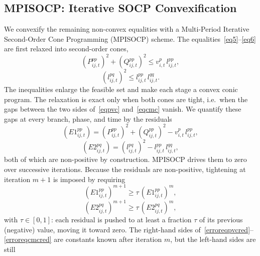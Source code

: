 \subsection{MPISOCP: Iterative SOCP Convexification}
\label{ssec:mpisocp}

We convexify the remaining non-convex equalities with a Multi-Period
Iterative Second-Order Cone Programming (MPISOCP) scheme. The
equalities~\eqref{eq5}--\eqref{eq6} are first relaxed into second-order
cones,
\begin{equation}\label{eqpvc}
\left( P_{ij,t}^{pp} \right)^2 + \left( Q_{ij,t}^{pp} \right)^2
\leq v_{i,t}^p \, l_{ij,t}^{pp},
\end{equation}
\begin{equation}\label{eqcmc}
\left( l_{ij,t}^{pq} \right)^2 \leq l_{ij,t}^{pp} \, l_{ij,t}^{qq}.
\end{equation}
The inequalities enlarge the feasible set and make each stage a convex
conic program. The relaxation is exact only when both cones are tight,
i.e.\ when the gaps between the two sides of~\eqref{eqpvc}
and~\eqref{eqcmc} vanish. We quantify these gaps at every branch,
phase, and time by the residuals
\begin{equation}\label{erroreqpvc}
\left( E1_{ij,t}^{pp} \right) = \left( P_{ij,t}^{pp} \right)^2 + \left( Q_{ij,t}^{pp} \right)^2
- v_{i,t}^p \, l_{ij,t}^{pp},
\end{equation}
\begin{equation}\label{erroreqcmc}
\left( E2_{ij,t}^{pq} \right) = \left( l_{ij,t}^{pq} \right)^2 - l_{ij,t}^{pp} \, l_{ij,t}^{qq},
\end{equation}
both of which are non-positive by construction. MPISOCP drives them to
zero over successive iterations. Because the residuals are non-positive,
tightening at iteration $m{+}1$ is imposed by requiring
\begin{equation}\label{erroreqpvcred}
(E1_{ij,t}^{pp})^{m+1} \geq \tau\, (E1_{ij,t}^{pp})^{m},
\end{equation}
\begin{equation}\label{erroreqcmcred}
(E2_{ij,t}^{pq})^{m+1} \geq \tau\, (E2_{ij,t}^{pq})^{m},
\end{equation}
with $\tau\in[0,1]$: each residual is pushed to at least a fraction
$\tau$ of its previous (negative) value, moving it toward zero. The
right-hand sides of~\eqref{erroreqpvcred}--\eqref{erroreqcmcred} are
constants known after iteration $m$, but the left-hand sides are still
